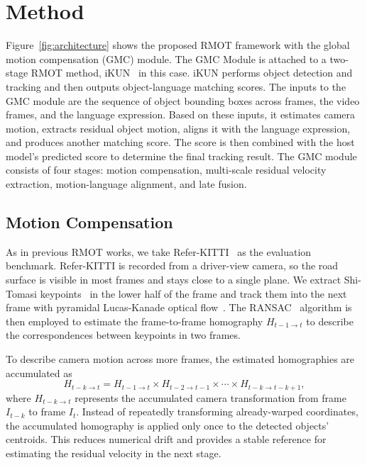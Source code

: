 \documentclass{article}
\begin{document}


\section{Method}
\label{sec:method}
Figure~\ref{fig:architecture} shows the proposed RMOT framework with the global motion compensation (GMC) module. The GMC Module is attached to a two-stage RMOT method, iKUN~\cite{ikun} in this case. iKUN performs object detection and tracking and then outputs object-language matching scores. The inputs to the GMC module are the sequence of object bounding boxes across frames, the video frames, and the language expression. Based on these inputs, it estimates camera motion, extracts residual object motion, aligns it with the language expression, and produces another matching score. The score is then combined with the host model's predicted score to determine the final tracking result. The GMC module consists of four stages: motion compensation, multi-scale residual velocity extraction, motion-language alignment, and late fusion. 

\subsection{Motion Compensation}
\label{sec:ego}
As in previous RMOT works, we take Refer-KITTI~\cite{transrmot} as the evaluation benchmark. Refer-KITTI is recorded from a driver-view camera, so the road surface is visible in most frames and stays close to a single plane. We extract Shi-Tomasi keypoints~\cite{shitomasi} in the lower half of the frame and track them into the next frame with pyramidal Lucas-Kanade optical flow~\cite{lucaskanade}. The RANSAC~\cite{ransac} algorithm is then employed to estimate the frame-to-frame homography $H_{t-1 \to t}$ to describe the correspondences between keypoints in two frames. %

To describe camera motion across more frames, the estimated homographies are accumulated as
\begin{equation}
  H_{t-k \to t} = H_{t-1 \to t} \times H_{t-2 \to t-1} \times \cdots \times H_{t-k \to t-k+1},
  \label{eq:cumulative}
\end{equation}
where $H_{t-k \to t}$ represents the accumulated camera transformation from frame $I_{t-k}$ to frame $I_t$. Instead of repeatedly transforming already-warped coordinates, the accumulated homography is applied only once to the detected objects' centroids. This reduces numerical drift and provides a stable reference for estimating the residual velocity in the next stage.
\end{document}
